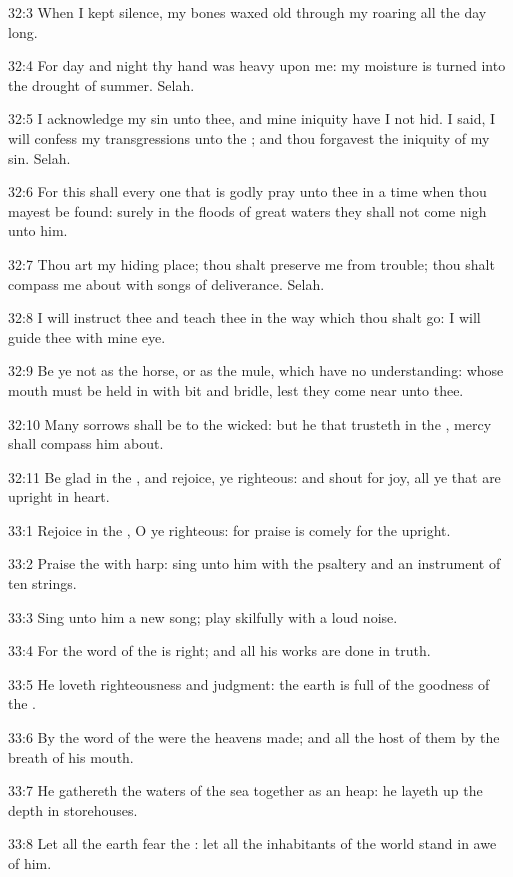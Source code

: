 32:3 When I kept silence, my bones waxed old through my roaring all the day long.

32:4 For day and night thy hand was heavy upon me: my moisture is turned into the drought of summer. Selah.

32:5 I acknowledge my sin unto thee, and mine iniquity have I not hid.  I said, I will confess my transgressions unto the \LORD; and thou forgavest the iniquity of my sin. Selah.

32:6 For this shall every one that is godly pray unto thee in a time when thou mayest be found: surely in the floods of great waters they shall not come nigh unto him.

32:7 Thou art my hiding place; thou shalt preserve me from trouble; thou shalt compass me about with songs of deliverance. Selah.

32:8 I will instruct thee and teach thee in the way which thou shalt go: I will guide thee with mine eye.

32:9 Be ye not as the horse, or as the mule, which have no understanding: whose mouth must be held in with bit and bridle, lest they come near unto thee.

32:10 Many sorrows shall be to the wicked: but he that trusteth in the \LORD, mercy shall compass him about.

32:11 Be glad in the \LORD, and rejoice, ye righteous: and shout for joy, all ye that are upright in heart.



33:1 Rejoice in the \LORD, O ye righteous: for praise is comely for the upright.

33:2 Praise the \LORD with harp: sing unto him with the psaltery and an instrument of ten strings.

33:3 Sing unto him a new song; play skilfully with a loud noise.

33:4 For the word of the \LORD is right; and all his works are done in truth.

33:5 He loveth righteousness and judgment: the earth is full of the goodness of the \LORD.

33:6 By the word of the \LORD were the heavens made; and all the host of them by the breath of his mouth.

33:7 He gathereth the waters of the sea together as an heap: he layeth up the depth in storehouses.

33:8 Let all the earth fear the \LORD: let all the inhabitants of the world stand in awe of him.

